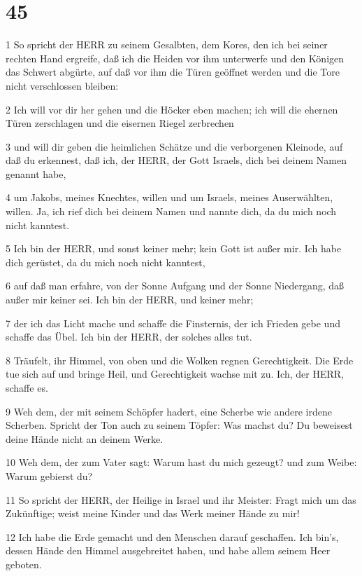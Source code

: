 \chapter{45}

\par 1 So spricht der HERR zu seinem Gesalbten, dem Kores, den ich bei seiner rechten Hand ergreife, daß ich die Heiden vor ihm unterwerfe und den Königen das Schwert abgürte, auf daß vor ihm die Türen geöffnet werden und die Tore nicht verschlossen bleiben:
\par 2 Ich will vor dir her gehen und die Höcker eben machen; ich will die ehernen Türen zerschlagen und die eisernen Riegel zerbrechen
\par 3 und will dir geben die heimlichen Schätze und die verborgenen Kleinode, auf daß du erkennest, daß ich, der HERR, der Gott Israels, dich bei deinem Namen genannt habe,
\par 4 um Jakobs, meines Knechtes, willen und um Israels, meines Auserwählten, willen. Ja, ich rief dich bei deinem Namen und nannte dich, da du mich noch nicht kanntest.
\par 5 Ich bin der HERR, und sonst keiner mehr; kein Gott ist außer mir. Ich habe dich gerüstet, da du mich noch nicht kanntest,
\par 6 auf daß man erfahre, von der Sonne Aufgang und der Sonne Niedergang, daß außer mir keiner sei. Ich bin der HERR, und keiner mehr;
\par 7 der ich das Licht mache und schaffe die Finsternis, der ich Frieden gebe und schaffe das Übel. Ich bin der HERR, der solches alles tut.
\par 8 Träufelt, ihr Himmel, von oben und die Wolken regnen Gerechtigkeit. Die Erde tue sich auf und bringe Heil, und Gerechtigkeit wachse mit zu. Ich, der HERR, schaffe es.
\par 9 Weh dem, der mit seinem Schöpfer hadert, eine Scherbe wie andere irdene Scherben. Spricht der Ton auch zu seinem Töpfer: Was machst du? Du beweisest deine Hände nicht an deinem Werke.
\par 10 Weh dem, der zum Vater sagt: Warum hast du mich gezeugt? und zum Weibe: Warum gebierst du?
\par 11 So spricht der HERR, der Heilige in Israel und ihr Meister: Fragt mich um das Zukünftige; weist meine Kinder und das Werk meiner Hände zu mir!
\par 12 Ich habe die Erde gemacht und den Menschen darauf geschaffen. Ich bin's, dessen Hände den Himmel ausgebreitet haben, und habe allem seinem Heer geboten.
